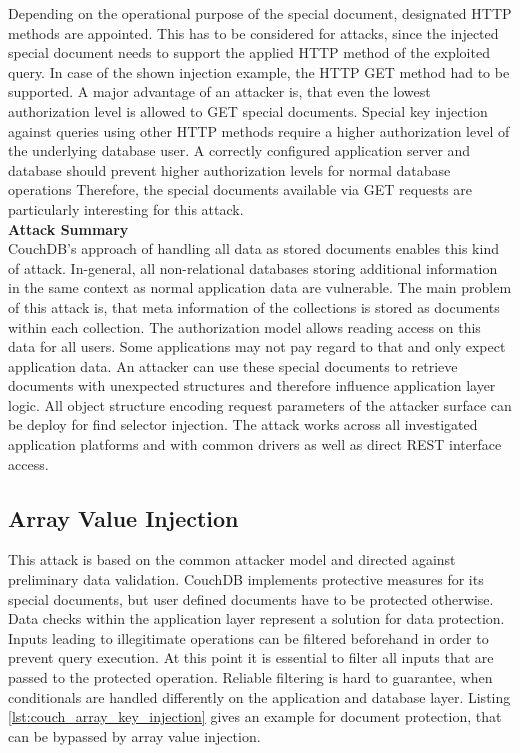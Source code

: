 Depending on the operational purpose of the special document, designated HTTP methods are appointed. This has to be considered for attacks, since the injected special document needs to support the applied HTTP method of the exploited query. In case of the shown injection example, the HTTP GET method had to be supported. A major advantage of an attacker is, that even the lowest authorization level is allowed to GET special documents. Special key injection against queries using other HTTP methods require a higher authorization level of the underlying database user. A correctly configured application server and database should prevent higher authorization levels for normal database operations Therefore, the special documents available via GET requests are particularly interesting for this attack. \\

\textbf{Attack Summary} \\
CouchDB's approach of handling all data as stored documents enables this kind of attack. In-general, all non-relational databases storing additional information in the same context as normal application data are vulnerable. The main problem of this attack is, that meta information of the collections is stored as documents within each collection. The authorization model allows reading access on this data for all users. Some applications may not pay regard to that and only expect application data. An attacker can use these special documents to retrieve documents with unexpected structures and therefore influence application layer logic. All object structure encoding request parameters of the attacker surface can be deploy for find selector injection. The attack works across all investigated application platforms and with common drivers as well as direct REST interface access. 

\subsection{Array Value Injection}
This attack is based on the common attacker model and directed against preliminary data validation. CouchDB implements protective measures for its special documents, but user defined documents have to be protected otherwise. Data checks within the application layer represent a solution for data protection. Inputs leading to illegitimate operations can be filtered beforehand in order to prevent query execution. At this point it is essential to filter all inputs that are passed to the protected operation. Reliable filtering is hard to guarantee, when conditionals are handled differently on the application and database layer. Listing \ref{lst:couch_array_key_injection} gives an example for document protection, that can be bypassed by array value injection.\\

